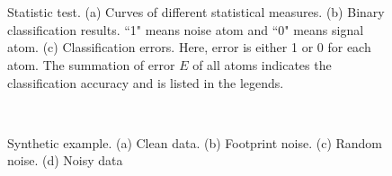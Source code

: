\begin{figure}[htb!]
\centering
{} \\
    \\
\caption{Statistic test. (a) Curves of different statistical measures. (b) Binary classification results. ``1" means noise atom and ``0" means signal atom. (c) Classification errors. Here,  error is either 1 or 0 for each atom. The summation of error $E$ of all atoms indicates the classification accuracy and is listed in the legends. }
\label{fig:sta_curves,sta_result,sta_err}
\end{figure}


\begin{figure}[htb!]
\centering
{}
\\
\caption{Synthetic example. (a) Clean data. (b) Footprint noise. (c) Random noise. (d) Noisy data}
\label{fig:syn-c,syn-nft,syn-nrand,syn-n}
\end{figure}


